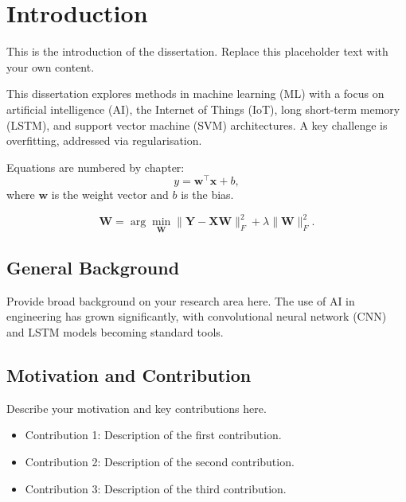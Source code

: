 \chapter{Introduction}
\label{chap:intro}

This is the introduction of the dissertation. Replace this placeholder
text with your own content.

This dissertation explores methods in machine learning (ML) with a focus on artificial intelligence (AI), the Internet of Things (IoT), long short-term memory (LSTM), and support vector machine (SVM) architectures. A key challenge is overfitting, addressed via regularisation.

Equations are numbered by chapter:
\begin{equation}
  y = \mathbf{w}^\top \mathbf{x} + b,
  \label{eq:linear}
\end{equation}
where $\mathbf{w}$ is the weight vector and $b$ is the bias.

\begin{equation}
  \mathbf{W} = \arg\min_{\mathbf{W}}
    \|\mathbf{Y} - \mathbf{XW}\|_F^2 + \lambda\|\mathbf{W}\|_F^2.
  \label{eq:ridge}
\end{equation}

\section{General Background}
\label{sec:background}

Provide broad background on your research area here. The use of
AI in engineering has grown significantly, with convolutional neural
network (CNN) and LSTM models becoming standard tools.

\section{Motivation and Contribution}
\label{sec:motivation}

Describe your motivation and key contributions here.

\begin{itemize}
  \item Contribution 1: Description of the first contribution.
  \item Contribution 2: Description of the second contribution.
  \item Contribution 3: Description of the third contribution.
\end{itemize}

